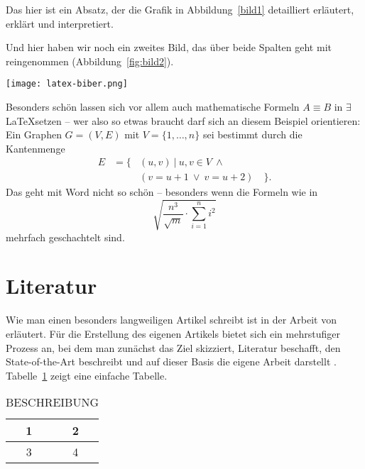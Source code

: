 \documentclass[a4paper,10pt,parskip,twocolumn]{article}
\begin{document}
Das hier ist ein Absatz, der die Grafik in Abbildung~\ref{bild1} detailliert erläutert, erklärt und interpretiert.




Und hier haben wir noch ein zweites Bild, das über beide Spalten geht mit reingenommen (Abbildung~\ref{fig:bild2}).

\begin{figure*}[t]
  \centering
  \texttt{[image: latex-biber.png]}
  \caption{Konfiguration TeXstudio}
  \label{fig:bild2}
\end{figure*}

Besonders schön lassen sich vor allem auch mathematische Formeln $A \equiv B$ in $\exists$ \LaTeX setzen -- wer also so etwas braucht darf sich an diesem Beispiel orientieren: Ein Graphen $G=(V,E)$ mit $V=\{1,\ldots,n\}$ sei bestimmt durch die Kantenmenge
\begin{eqnarray*}
  E &= \{ & (u,v) \ | \ u,v\in V \ \wedge\\
  && (v=u+1 \ \vee \ v=u+2) \quad \} .
\end{eqnarray*}
Das geht mit Word nicht so schön -- besonders wenn die Formeln wie in
\begin{displaymath}
  \sqrt{ \frac{n^{3}}{\sqrt{m}} \cdot \sum_{i=1}^n i^2 }
\end{displaymath}
mehrfach geschachtelt sind.

\section{Literatur}

Wie man einen besonders langweiligen Artikel schreibt ist in der Arbeit von \cite{sand-jensen_how_2007} erläutert. Für die Erstellung des eigenen Artikels bietet sich ein mehrstufiger Prozess an, bei dem man zunächst das Ziel skizziert, Literatur beschafft, den State-of-the-Art beschreibt und auf dieser Basis die eigene Arbeit darstellt \cite{berndtsson_thesis_2008}.
Tabelle~\ref{tab:meinetabelle} zeigt eine einfache Tabelle.


\begin{table}
	\caption{BESCHREIBUNG}
	\label{tab:meinetabelle}
	\centering
	\begin{tabular}{|c|c|}
	\hline 1 & 2 \\ 
	\hline 3 & 4 \\ 
	\hline 
	\end{tabular} 
\end{table}
\end{document}
